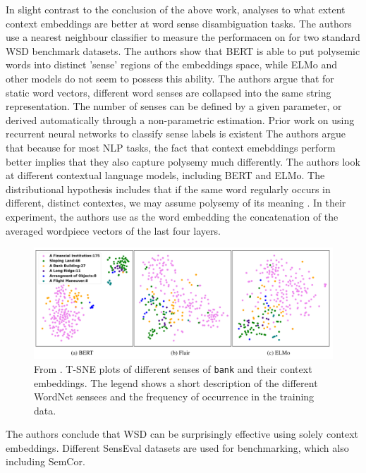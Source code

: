 \documentclass[a4paper,12pt,twoside,openright]{report}
\begin{document}
In slight contrast to the conclusion of the above work, \cite{wiedmann19} analyses to what extent context embeddings are better at word sense disambiguation tasks.
The authors use a nearest neighbour classifier to measure the performacen on  for two standard WSD benchmark datasets.
The authors show that BERT is able to put polysemic words into distinct 'sense' regions of the embeddings space, while ELMo and other models do not seem to possess this ability.
The authors argue that for static word vectors, different word senses are collapsed into the same string representation.
The number of senses can be defined by a given parameter, or derived automatically through a non-parametric estimation.
Prior work on using recurrent neural networks to classify sense labels is existent
The authors argue that because for most NLP tasks, the fact that context emebddings perform better implies that they also capture polysemy much differently.
The authors look at different contextual language models, including BERT and ELMo.
The distributional hypothesis includes that if the same word regularly occurs in different, distinct contextes, we may assume polysemy of its meaning \cite{miller91}.
In their experiment, the authors use as the word embedding the concatenation of the averaged wordpiece vectors of the last four layers.

\begin{figure}[h]
	\center
  \includegraphics[width=0.9\linewidth]{./assets/relatedwork/wsd_bert.png}
  \caption{From \cite{wiedmann19}. T-SNE plots of different senses of \texttt{bank} and their context embeddings. The legend shows a short description of the different WordNet sensees and the frequency of occurrence in the training data.
  }
  \label{fig:bert_wsd}
\end{figure}

The authors conclude that WSD can be surprisingly effective using solely context embeddings.
Different SensEval datasets are used for benchmarking, which also including SemCor. \\
\end{document}
